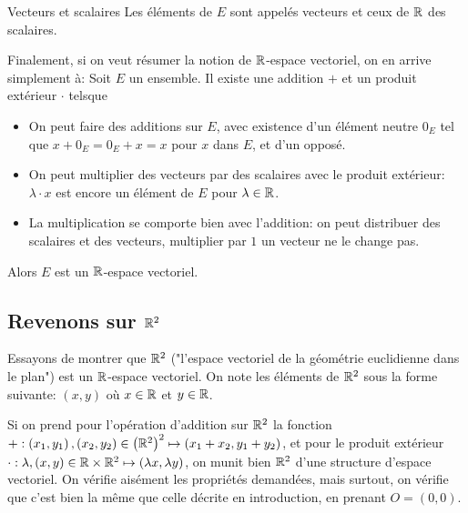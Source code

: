\documentclass{classe}
\begin{document}
\begin{définition}{Vecteurs et scalaires}{}
	Les éléments de $E$ sont appelés vecteurs et ceux de $\mathbb{R}$ des scalaires.
\end{définition}

Finalement, si on veut résumer la notion de $\mathbb{R}$-espace vectoriel, on en arrive simplement à:
Soit $E$ un ensemble. Il existe une addition $+$ et un produit extérieur $\cdot$ telsque
\begin{itemize}
		\item On peut faire des additions sur $E$, avec existence d'un élément neutre $0_E$ tel que $x + 0_E = 0_E + x = x$ pour $x$ dans $E$, et d'un opposé.
		\item On peut multiplier des vecteurs par des scalaires avec le produit extérieur: $\lambda\cdot x$ est encore un élément de $E$ pour $\lambda \in \mathbb{R}$.
		\item La multiplication se comporte bien avec l'addition: on peut distribuer des scalaires et des vecteurs, multiplier par $1$ un vecteur ne le change pas.
\end{itemize}
Alors $E$ est un $\mathbb{R}$-espace vectoriel.

\subsection{Revenons sur $\mathbb{R}^2$}

Essayons de montrer que $\mathbb{R}^2$ ("l'espace vectoriel de la géométrie euclidienne dans le plan") est un $\mathbb{R}$-espace vectoriel. On note les éléments de $\mathbb{R}^2$ sous la forme suivante: $(x, y)$ où $x\in\mathbb{R}$ et $y\in\mathbb{R}$.


Si on prend pour l'opération d'addition sur $\mathbb{R}^{2}$ la fonction $+: \left( x_{1}, y_{1} \right), \left( x_{2}, y_{2} \right) \in \left(\mathbb{R}^{2}\right)^{2} \mapsto \left( x_{1} + x_{2}, y_{1} + y_{2} \right)$, et pour le produit extérieur $\cdot: \lambda, (x, y) \in \mathbb{R}\times \mathbb{R}^{2} \mapsto \left( \lambda x, \lambda y \right)$, on munit bien $\mathbb{R}^{2}$ d'une structure d'espace vectoriel.
On vérifie aisément les propriétés demandées, mais surtout, on vérifie que c'est bien la même que celle décrite en introduction, en prenant $O = \left( 0, 0 \right)$.
\end{document}
